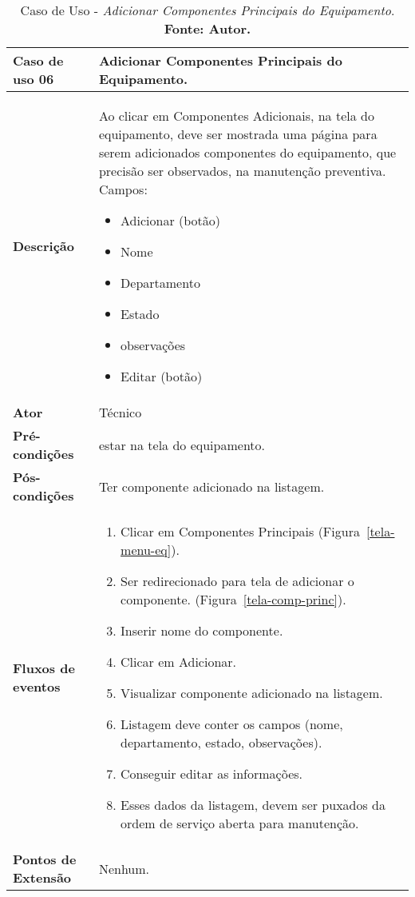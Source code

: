 \begin{apendicesenv}
\begin{table}[H]
\centering
\caption{Caso de Uso - \textit{Adicionar Componentes Principais do Equipamento}. \textbf{Fonte: Autor.}}
\label{uc06}
\begin{tabular}{ | p{5cm} | p{10cm} |  }
\hline
	\textbf{Caso de uso 06} & Adicionar Componentes Principais do Equipamento. \\ \hline
	\textbf{Descrição} & Ao clicar em Componentes Adicionais, na tela do equipamento, deve ser mostrada uma página para serem adicionados componentes do equipamento, que precisão ser observados, na manutenção preventiva. Campos: \begin{itemize}
															                    \item Adicionar (botão)
															                    \item Nome
															                    \item Departamento 
															                    \item Estado 
															                    \item observações
															                    \item Editar (botão)
															                    \end{itemize} \\ \hline
	\textbf{Ator} & Técnico \\ \hline
	\textbf{Pré-condições} & estar na tela do equipamento. \\ \hline
	\textbf{Pós-condições} & Ter componente adicionado na listagem. \\ \hline
	\textbf{Fluxos de eventos} & \begin{enumerate}
									\item Clicar em Componentes Principais (Figura~\ref{tela-menu-eq}).    
									\item Ser redirecionado para tela de adicionar o componente. (Figura~\ref{tela-comp-princ}).
									\item Inserir nome do componente.
									\item Clicar em Adicionar.
									\item Visualizar componente adicionado na listagem.
									\item Listagem deve conter os campos (nome, departamento, estado, observações).
									\item Conseguir editar as informações.
									\item Esses dados da listagem, devem ser puxados da ordem de serviço aberta para manutenção.
								 \end{enumerate}   \\ \hline
	\textbf{Pontos de Extensão} & Nenhum. \\ \hline
\end{tabular}
\end{table}


\end{apendicesenv}
